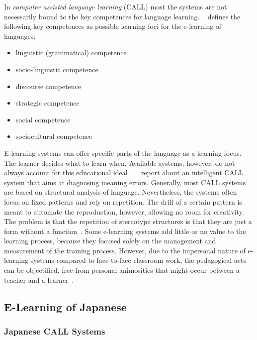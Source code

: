 In \emph{computer assisted language learning} (CALL) most the systems are not
necessarily bound to the key competences for language learning. 
~\citeyear{Richert2007} defines the following key
competences as possible learning foci for the e-learning of languages:
\begin{itemize}
  \item linguistic (grammatical) competence
  \item socio-linguistic competence
  \item discourse competence
  \item strategic competence
  \item social competence
  \item sociocultural competence
\end{itemize}
E-learning systems can offer specific parts of the language as a 
learning focus. The learner decides what to learn when. Available systems,
however, do not always account for this educational 
ideal~.
~\citeyear{Bailey2009} report about an intelligent 
CALL system that aims at diagnosing meaning errors.
Generally, most CALL systems are based on structural analysis of 
language. Nevertheless, the systems often focus on fixed patterns and rely on 
repetition. The drill of a certain pattern is meant to automate the 
reproduction, however, allowing no room for creativity.
The problem is that the repetition of stereotype structures is that they are just
a form without a function~.
Some e-learning systems add little or no value to the learning process, 
because they focused solely on the management and measurement of the training 
process. However, due to the impersonal nature of
e-learning systems compared to face-to-face classroom work, the pedagogical
acts can be objectified, free from personal animosities that might occur between
a teacher and a learner~. 
 
\subsection{E-Learning of Japanese}
\label{sec:elearn:elearningofjapanese}

\subsubsection{Japanese CALL Systems}
\label{sec:elearn:japanesecallsystems}

